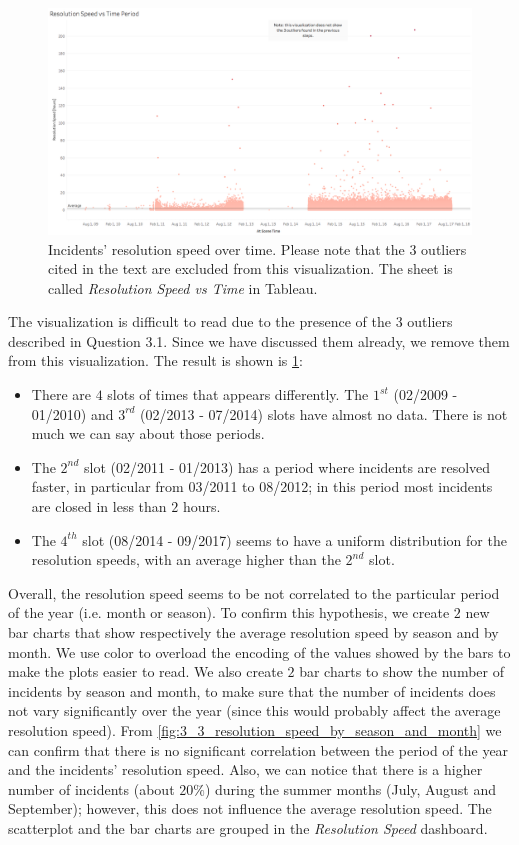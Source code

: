 \begin{figure}[h]
	\centering
	\includegraphics[width=\columnwidth]{figures/3_3_resolution_speed_vs_time}
	\caption{Incidents' resolution speed over time. Please note that the $3$ outliers cited in the text are excluded from this visualization. The sheet is called \textit{Resolution Speed vs Time} in Tableau.}
	\label{fig:3_3_resolution_speed_vs_time}
\end{figure}

The visualization is difficult to read due to the presence of the $3$ outliers described in Question 3.1.
Since we have discussed them already, we remove them from this visualization.
The result is shown is \cref{fig:3_3_resolution_speed_vs_time}:
\begin{itemize}
    \item There are $4$ slots of times that appears differently. The $1^{st}$ (02/2009 - 01/2010) and $3^{rd}$ (02/2013 - 07/2014) slots have almost no data. There is not much we can say about those periods.
    \item The $2^{nd}$ slot (02/2011 - 01/2013) has a period where incidents are resolved faster, in particular from 03/2011 to 08/2012; in this period most incidents are closed in less than $2$ hours.
    \item The $4^{th}$ slot (08/2014 - 09/2017) seems to have a uniform distribution for the resolution speeds, with an average higher than the $2^{nd}$ slot.
\end{itemize}

Overall, the resolution speed seems to be not correlated to the particular period of the year (i.e. month or season).
To confirm this hypothesis, we create $2$ new bar charts that show respectively the average resolution speed by season and by month.
We use color to overload the encoding of the values showed by the bars to make the plots easier to read.
We also create $2$ bar charts to show the number of incidents by season and month, to make sure that the number of incidents does not vary significantly over the year (since this would probably affect the average resolution speed).
From \cref{fig:3_3_resolution_speed_by_season_and_month} we can confirm that there is no significant correlation between the period of the year and the incidents' resolution speed.
Also, we can notice that there is a higher number of incidents (about $20\%$) during the summer months (July, August and September);
however, this does not influence the average resolution speed.
The scatterplot and the bar charts are grouped in the \textit{Resolution Speed} dashboard.

